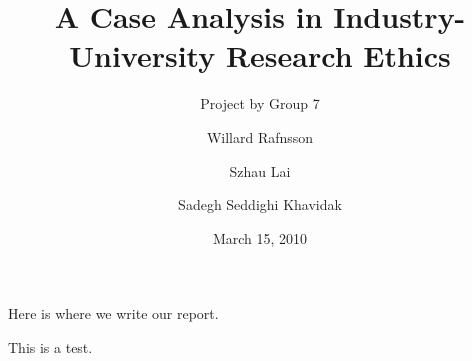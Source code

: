 \documentclass[draft,11pt,openright,monochrome,british,a4paper]{scrartcl}
\begin{document}
\title{A Case Analysis in Industry-University Research Ethics}
\author{Willard Rafnsson \and Szhau Lai \and Sadegh Seddighi Khavidak}
\subtitle{Project by Group 7}
\date{March 15, 2010}
\subject{Ethics, Science \& Society}
\maketitle


Here is where we write our report.

This is a test.

\end{document}
